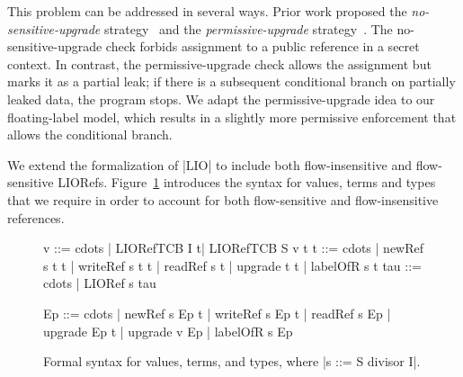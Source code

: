 This problem can be addressed in several ways. Prior work proposed the
\emph{no-sensitive-upgrade} strategy~\citep{?} and the
\emph{permissive-upgrade} strategy~\citep{?}. The no-sensitive-upgrade
check forbids assignment to a public reference in a secret context. In
contrast, the permissive-upgrade check allows the assignment but marks
it as a partial leak; if there is a subsequent conditional branch on
partially leaked data, the program stops. We adapt the
permissive-upgrade idea to our floating-label model, which results in
a slightly more permissive enforcement that allows the conditional
branch.

We extend the formalization of |LIO| to include both flow-insensitive
and flow-sensitive LIORefs. Figure~\ref{fig:fs-exts-syntax} introduces
the syntax for values, terms and types that we require in order to
account for both flow-sensitive and flow-insensitive references.

\begin{figure}[!ht] %
\centering
\begin{code}
v   ::= cdots  | LIORefTCB I t| LIORefTCB S v t
t   ::= cdots  | newRef s t t | writeRef s t t 
               | readRef s t | upgrade t t
               | labelOfR s t
tau ::= cdots  | LIORef s tau


Ep   ::= cdots  | newRef s Ep t | writeRef s Ep t 
                | readRef s Ep | upgrade Ep t | upgrade v Ep
                | labelOfR s Ep
\end{code}
\caption{Formal syntax for values, terms, and types,
where |s  ::=  S  divisor I|.\label{fig:fs-exts-syntax}}
\vspace*{-5pt}
\end{figure} 

